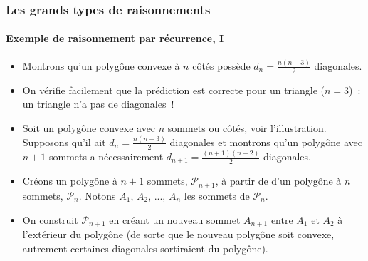 \documentclass[10pt,notheorems]{beamer}
\theoremstyle{plain}
\theoremstyle{definition} %
\begin{document}
\begin{frame}
  \frametitle{Les grands types de raisonnements}
  \framesubtitle{Exemple de raisonnement par récurrence, I}
  \hypertarget{slide_raisonnement_par_reccurence_2}{}

  \bigskip

  \begin{itemize}

  \item Montrons qu'un polygône convexe à $n$ côtés possède $d_n = \frac{n(n-3)}{2}$ diagonales.\newline

  \item On vérifie facilement que la prédiction est correcte pour un triangle ($n=3$)~: un triangle n'a pas de diagonales~!\newline

  \item Soit un polygône convexe avec $n$ sommets ou côtés, voir \hyperlink{slide_raisonnement_par_reccurence_3}{l'illustration}. Supposons qu'il ait $d_n = \frac{n(n-3)}{2}$ diagonales et montrons qu'un polygône avec $n+1$ sommets a nécessairement $d_{n+1} = \frac{(n+1)(n-2)}{2}$ diagonales.\newline

  \item Créons un polygône à $n+1$ sommets, $\mathcal P_{n+1}$, à partir de d'un polygône à $n$ sommets, $\mathcal P_{n}$. Notons $A_1$, $A_2$, ..., $A_n$ les sommets de $\mathcal P_{n}$.\newline

  \item On construit $\mathcal P_{n+1}$ en créant un nouveau sommet $A_{n+1}$ entre $A_1$ et $A_2$ à l'extérieur du polygône (de sorte que le nouveau polygône soit convexe, autrement certaines diagonales sortiraient du polygône).

  \end{itemize}

\end{frame}
\end{document}

